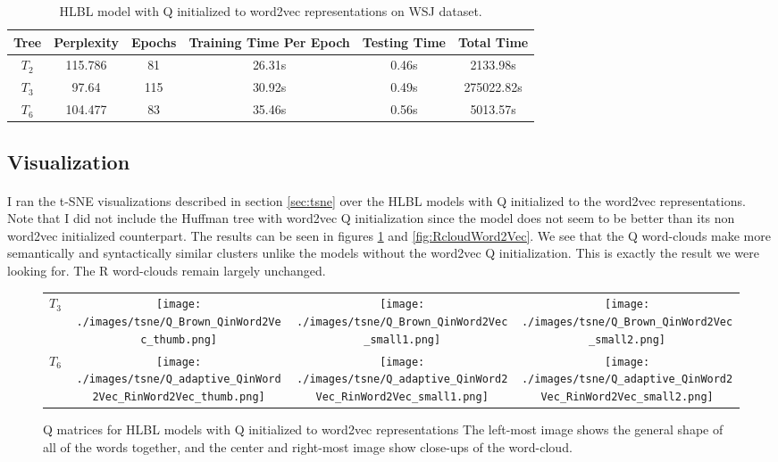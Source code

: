\begin{table*} \centering
{}
\begin{tabular}{cccccc}\toprule
Tree & Perplexity & Epochs & Training Time Per Epoch & Testing Time & Total Time\\ 
\midrule
$T_2$ & 115.786 & 81 & 26.31s &0.46s & 2133.98s \\
$T_3$ & 97.64 & 115& 30.92s & 0.49s& 275022.82s\\
$T_6$& 104.477 & 83& 35.46s & 0.56s& 5013.57s\\
\bottomrule
\end{tabular}
\caption{HLBL model with Q initialized to word2vec representations on WSJ dataset.}
\label{tab:brownWord2vec}
\end{table*}

\subsection{Visualization}
\paragraph{}
I ran the t-SNE visualizations described in section \ref{sec:tsne} over the HLBL models with Q initialized to the word2vec representations. Note that I did not include the Huffman tree with word2vec Q initialization since the model does not seem to be better than its non word2vec initialized counterpart. The results can be seen in figures \ref{fig:QcloudWord2Vec} and \ref{fig:RcloudWord2Vec}. We see that the Q word-clouds make more semantically and syntactically similar clusters unlike the models without the word2vec Q initialization. This is exactly the result we were looking for. The R word-clouds remain largely unchanged. 

\begin{figure}[p]
\centering
\begin{tabular}{@{}C{2cm}ccc@{}}
$T_3$&
\texttt{[image: ./images/tsne/Q\_Brown\_QinWord2Vec\_thumb.png]} &
\texttt{[image: ./images/tsne/Q\_Brown\_QinWord2Vec\_small1.png]} &
\texttt{[image: ./images/tsne/Q\_Brown\_QinWord2Vec\_small2.png]}
\\
$T_6$ &
\texttt{[image: ./images/tsne/Q\_adaptive\_QinWord2Vec\_RinWord2Vec\_thumb.png]} &
\texttt{[image: ./images/tsne/Q\_adaptive\_QinWord2Vec\_RinWord2Vec\_small1.png]} &
\texttt{[image: ./images/tsne/Q\_adaptive\_QinWord2Vec\_RinWord2Vec\_small2.png]}
\end{tabular}
\caption{Q matrices for HLBL models with Q initialized to word2vec representations The left-most image shows the general shape of all of the words together, and the center and right-most image show close-ups of the word-cloud.}
\label{fig:QcloudWord2Vec}
\end{figure}

